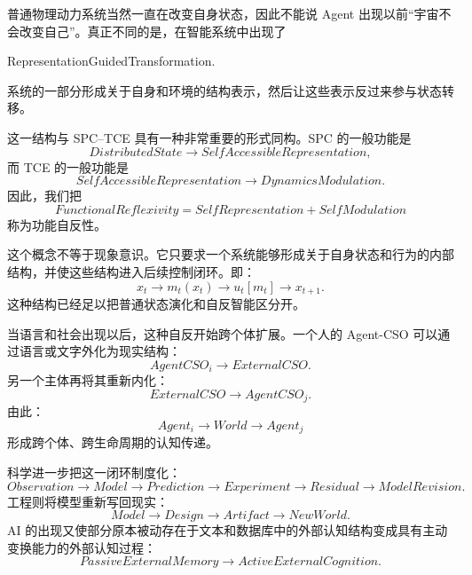 普通物理动力系统当然一直在改变自身状态，因此不能说 Agent 出现以前“宇宙不会改变自己”。真正不同的是，在智能系统中出现了
\begin{statementbox}
RepresentationGuidedTransformation.
\end{statementbox}
系统的一部分形成关于自身和环境的结构表示，然后让这些表示反过来参与状态转移。

这一结构与 SPC--TCE 具有一种非常重要的形式同构。SPC 的一般功能是
\begin{equation}
DistributedState
\rightarrow
SelfAccessibleRepresentation,
\end{equation}
而 TCE 的一般功能是
\begin{equation}
SelfAccessibleRepresentation
\rightarrow
DynamicsModulation.
\end{equation}
因此，我们把
\begin{equation}
\boxed{
FunctionalReflexivity
=
SelfRepresentation
+
SelfModulation
}
\end{equation}
称为功能自反性。

这个概念不等于现象意识。它只要求一个系统能够形成关于自身状态和行为的内部结构，并使这些结构进入后续控制闭环。即：
\begin{equation}
x_t
\rightarrow
m_t(x_t)
\rightarrow
u_t[m_t]
\rightarrow
x_{t+1}.
\end{equation}
这种结构已经足以把普通状态演化和自反智能区分开。

当语言和社会出现以后，这种自反开始跨个体扩展。一个人的 Agent-CSO 可以通过语言或文字外化为现实结构：
\begin{equation}
AgentCSO_i
\rightarrow
ExternalCSO.
\end{equation}
另一个主体再将其重新内化：
\begin{equation}
ExternalCSO
\rightarrow
AgentCSO_j.
\end{equation}
由此：
\begin{equation}
\boxed{
Agent_i
\rightarrow
World
\rightarrow
Agent_j
}
\end{equation}
形成跨个体、跨生命周期的认知传递。

科学进一步把这一闭环制度化：
\begin{equation}
Observation
\rightarrow
Model
\rightarrow
Prediction
\rightarrow
Experiment
\rightarrow
Residual
\rightarrow
ModelRevision.
\end{equation}
工程则将模型重新写回现实：
\begin{equation}
Model
\rightarrow
Design
\rightarrow
Artifact
\rightarrow
NewWorld.
\end{equation}
AI 的出现又使部分原本被动存在于文本和数据库中的外部认知结构变成具有主动变换能力的外部认知过程：
\begin{equation}
PassiveExternalMemory
\rightarrow
ActiveExternalCognition.
\end{equation}

